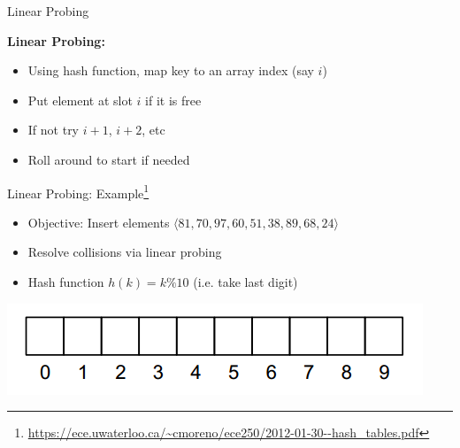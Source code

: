 \documentclass{beamer}
\begin{document}
\begin{frame}{Linear Probing}

    {\bf Linear Probing:}
    \begin{itemize}
        \item Using hash function, map key to an array index (say $i$)
        \item Put element at slot $i$ if it is free
        \item If not try $i+1$, $i+2$, etc
        \item Roll around to start if needed
    \end{itemize}
\end{frame}

\begin{frame}{Linear Probing: Example\footnote{\url{https://ece.uwaterloo.ca/~cmoreno/ece250/2012-01-30--hash_tables.pdf}}}
    \begin{itemize}
        \item Objective: Insert elements $\langle 81, 70, 97, 60, 51, 38, 89, 68, 24 \rangle$ 
        \item Resolve collisions via linear probing 
        \item Hash function $h(k) = k \% 10$ (i.e. take last digit)
    \end{itemize}
    \begin{center}
        \includegraphics[scale=0.5]{linearProbing1.png}
    \end{center}
\end{frame}
\end{document}

